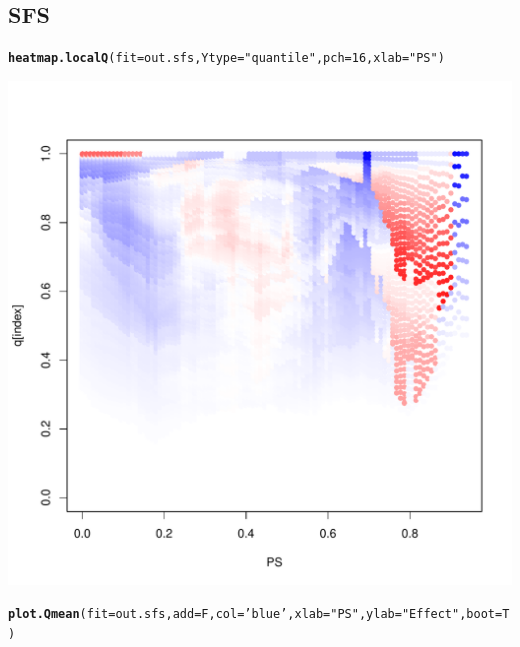 \documentclass{article}\usepackage[]{graphicx}\usepackage[]{color}
\makeatletter
\def\maxwidth{ %
  \ifdim\Gin@nat@width>\linewidth
    \linewidth
  \else
    \Gin@nat@width
  \fi
}
\newcommand{\hlnum}[1]{\textcolor[rgb]{0.686,0.059,0.569}{#1}}%
\newcommand{\hlstr}[1]{\textcolor[rgb]{0.192,0.494,0.8}{#1}}%
\newcommand{\hlstd}[1]{\textcolor[rgb]{0.345,0.345,0.345}{#1}}%
\newcommand{\hlkwc}[1]{\textcolor[rgb]{0.333,0.667,0.333}{#1}}%
\newcommand{\hlkwd}[1]{\textcolor[rgb]{0.737,0.353,0.396}{\textbf{#1}}}%
\newenvironment{kframe}{%
 \def\at@end@of@kframe{}%
 \ifinner\ifhmode%
  \def\at@end@of@kframe{\end{minipage}}%
  \begin{minipage}{\columnwidth}%
 \fi\fi%
 \def\FrameCommand##1{\hskip\@totalleftmargin \hskip-\fboxsep
 \colorbox{shadecolor}{##1}\hskip-\fboxsep
     \hskip-\linewidth \hskip-\@totalleftmargin \hskip\columnwidth}%
 \MakeFramed {\advance\hsize-\width
   \@totalleftmargin\z@ \linewidth\hsize
   \@setminipage}}%
 {\par\unskip\endMakeFramed%
 \at@end@of@kframe}
\newenvironment{knitrout}{}{} %
\makeatother
\begin{document}
\subsection{SFS}
\begin{knitrout}
\color{fgcolor}\begin{kframe}
\begin{alltt}
\hlkwd{heatmap.localQ}\hlstd{(}\hlkwc{fit}\hlstd{=out.sfs ,} \hlkwc{Ytype}\hlstd{=}\hlstr{"quantile"} \hlstd{,} \hlkwc{pch}\hlstd{=}\hlnum{16} \hlstd{,} \hlkwc{xlab}\hlstd{=}\hlstr{"PS"}\hlstd{)}
\end{alltt}
\end{kframe}

{\centering \includegraphics[width=\maxwidth]{figures/SFS-heatmap-1} 

}


\begin{kframe}\begin{alltt}
\hlkwd{plot.Qmean}\hlstd{(}\hlkwc{fit}\hlstd{=out.sfs ,} \hlkwc{add}\hlstd{=F ,} \hlkwc{col}\hlstd{=}\hlstr{'blue'} \hlstd{,} \hlkwc{xlab}\hlstd{=}\hlstr{"PS"} \hlstd{,} \hlkwc{ylab}\hlstd{=}\hlstr{"Effect"} \hlstd{,} \hlkwc{boot}\hlstd{=T)}
\end{alltt}
\end{kframe}


\end{knitrout}
\end{document}
